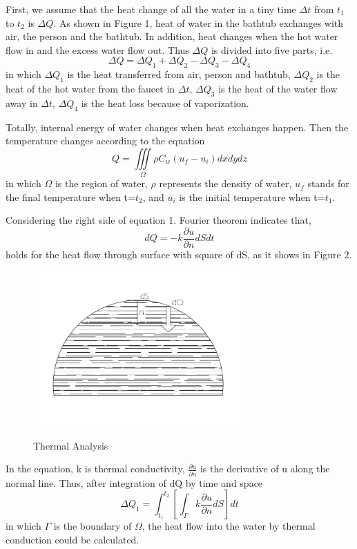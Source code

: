 \documentclass[12pt,a4paper,titlepage]{article}
\begin{document}
First, we assume that the heat change of all the water in a tiny time $\Delta t$ from $t_1$ to $t_2$ is $\Delta Q$.
As shown in Figure 1, heat of water in the bathtub exchanges with air, the person and the bathtub.
In addition, heat changes when the hot water flow in and the excess water flow out.
Thus $\Delta Q$ is divided into five parts, i.e.
\begin{equation}
 \Delta Q=\Delta Q_1+\Delta Q_2-\Delta Q_3-\Delta Q_4
\end{equation}
in which $\Delta Q_1$ is the heat transferred from air, person and bathtub,
$\Delta Q_2$ is the heat of the hot water from the faucet in $\Delta t$,
$\Delta Q_3$ is the heat of the water flow away in $\Delta t$,
$\Delta Q_4$ is the heat loss because of vaporization.

Totally, internal energy of water changes when heat exchanges happen.
Then the temperature changes according to the equation
\begin{equation}
 Q=\iiint\limits_{\Omega}\rho C_{w}(u_f - u_i)dx dy dz
\end{equation}
in which $\Omega$ is the region of water, $\rho$ represents the density of water, $u_f$ stands for the final temperature when t=$t_2$, and $u_i$ is the initial temperature when t=$t_1$.

Considering the right side of equation 1.
Fourier theorem indicates that,
\begin{equation}
 dQ=-k\frac{\partial u}{\partial n}dSdt
\end{equation}
holds for the heat flow through surface with square of dS, as it shows in Figure 2.
\begin{figure}[htb]
  \centering
  \includegraphics[width=8cm]{1.pdf}\\
  \caption{Thermal Analysis}\label{2_p}
\end{figure}
In the equation, k is thermal conductivity, $\frac{\partial u}{\partial n}$ is the derivative of u along the normal line. Thus, after integration of dQ by time and space
\begin{equation}
 \Delta Q_1=\int_{t_1}^{t_2}[{\int_{\Gamma}}k\frac{\partial u}{\partial n}dS]dt
\end{equation}
in which $\Gamma$ is the boundary of $\Omega$,
the heat flow into the water by thermal conduction could be calculated.
\end{document}
